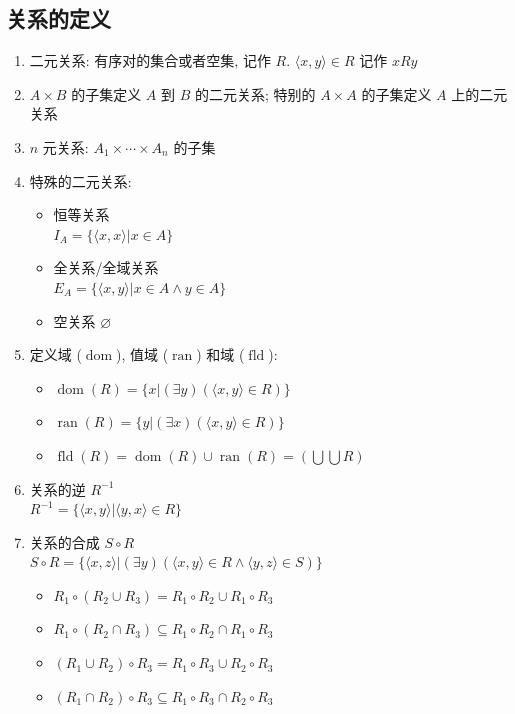 \documentclass[11pt,a4paper,twocolumn,fleqn]{article} %
\renewcommand{\emptyset}{\varnothing}
\DeclareMathOperator{\dom}{dom}
\DeclareMathOperator{\ran}{ran}
\DeclareMathOperator{\fld}{fld}
\begin{document}
\subsection{关系的定义} %
\label{sub:relationship}
\begin{enumerate}
	\item 二元关系: 有序对的集合或者空集, 记作 $R$. $\langle x, y \rangle \in R$
	记作 $xRy$
	\item $A\times B$ 的子集定义 $A$ 到 $B$ 的二元关系; 
	特别的 $A\times A$ 的子集定义 $A$ 上的二元关系
	\item $n$ 元关系: $A_1\times \cdots \times A_n$ 的子集
	\item 特殊的二元关系: 
	\begin{itemize}
		\item 恒等关系 \\
		$I_A = \{\langle x, x \rangle | x\in A\}$
		\item 全关系/全域关系 \\
		$E_A = \{\langle x, y \rangle | x\in A\land y\in A\}$
		\item 空关系 $\emptyset$
	\end{itemize}
	\item 定义域 ($\dom$), 值域 ($\ran$) 和域 ($\fld$): 
	\begin{itemize}
		\item $\dom(R) = \{x|(\exists y)(\langle x, y \rangle \in R)\}$
		\item $\ran(R) = \{y|(\exists x)(\langle x, y \rangle \in R)\}$
		\item $\fld(R) = \dom(R)\cup\ran(R) = \left(\bigcup\bigcup R\right)$
	\end{itemize}
	\item 关系的逆 $R^{-1}$\\
	$R^{-1} = \{ \langle x, y \rangle | \langle y, x \rangle \in R \}$
	\item 关系的合成 $S\circ R$\\
	$S\circ R = \{ \langle x, z \rangle | (\exists y) 
	( \langle x, y \rangle \in R \land \langle y, z \rangle \in S)\}$
	\begin{itemize}
		\item $R_1\circ (R_2\cup R_3) = R_1\circ R_2 \cup R_1 \circ R_3$
		\item $R_1\circ (R_2\cap R_3) \subseteq R_1\circ R_2 \cap R_1 \circ R_3$
		\item $(R_1 \cup R_2)\circ R_3 = R_1\circ R_3 \cup R_2 \circ R_3$
		\item $(R_1 \cap R_2)\circ R_3 \subseteq R_1\circ R_3 \cap R_2\circ R_3$

\end{itemize}
\end{enumerate}
\end{document}
